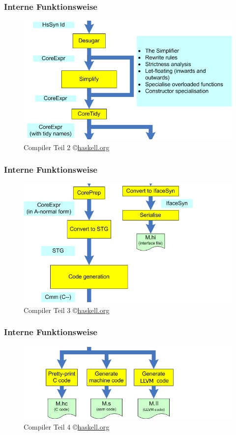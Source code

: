 \documentclass[fleqn,11pt,aspectratio=43]{beamer}
\begin{document}
\begin{frame}[noframenumbering]
\frametitle{Interne Funktionsweise}
\begin{figure}
\centering
\includegraphics[scale=0.4]{images/HscPipe2_2.png}
\caption{Compiler Teil 2 \copyright \url{haskell.org}}
\end{figure}
\end{frame}

\begin{frame}[noframenumbering]
\frametitle{Interne Funktionsweise}
\begin{figure}
\centering
\includegraphics[scale=0.4]{images/HscPipe2_3.png}
\caption{Compiler Teil 3 \copyright \url{haskell.org}}
\end{figure}
\end{frame}

\begin{frame}[noframenumbering]
\frametitle{Interne Funktionsweise}
\begin{figure}
\centering
\includegraphics[scale=0.4]{images/HscPipe2_4.png}
\caption{Compiler Teil 4 \copyright \url{haskell.org}}
\end{figure}
\end{frame}
\end{document}
